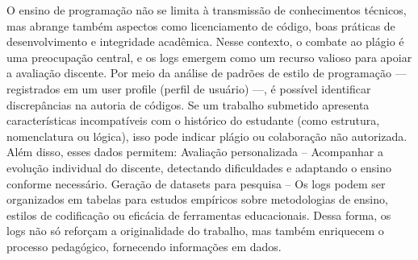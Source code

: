 \documentclass[10pt,a4paper]{article}
\begin{document}
\begin{enumerate}
O ensino de programação não se limita à transmissão de conhecimentos técnicos, mas abrange também aspectos como licenciamento de código, boas práticas de desenvolvimento e integridade acadêmica. Nesse contexto, o combate ao plágio é uma preocupação central, e os logs emergem como um recurso valioso para apoiar a avaliação discente.
Por meio da análise de padrões de estilo de programação — registrados em um user profile (perfil de usuário) —, é possível identificar discrepâncias na autoria de códigos. Se um trabalho submetido apresenta características incompatíveis com o histórico do estudante (como estrutura, nomenclatura ou lógica), isso pode indicar plágio ou colaboração não autorizada. Além disso, esses dados permitem: Avaliação personalizada – Acompanhar a evolução individual do discente, detectando dificuldades e adaptando o ensino conforme necessário.
Geração de datasets para pesquisa – Os logs podem ser organizados em tabelas para estudos empíricos sobre metodologias de ensino, estilos de codificação ou eficácia de ferramentas educacionais.
Dessa forma, os logs não só reforçam a originalidade do trabalho, mas também enriquecem o processo pedagógico, fornecendo informações em dados.


\end{enumerate}
\end{document}

